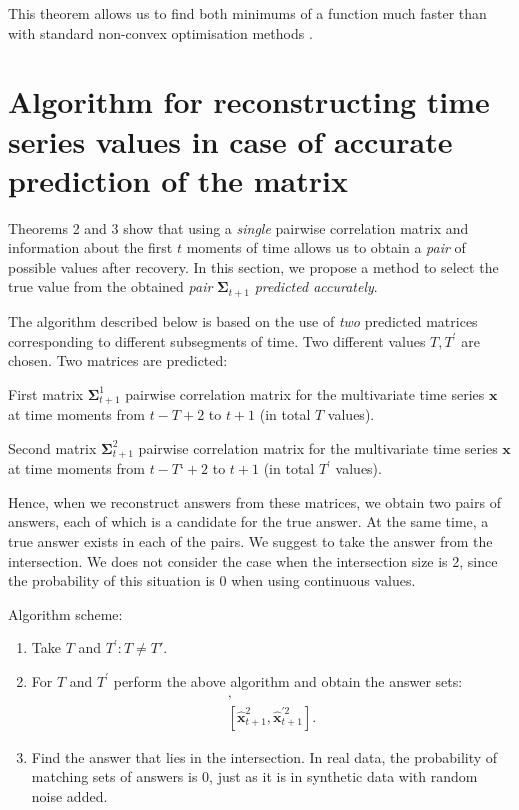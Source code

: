 \documentclass[12pt]{article}
\begin{document}
{This theorem allows us to find both minimums of a function much faster than with standard non-convex optimisation methods \cite{mikhalevich2024methodsnonconvexoptimization}.

\section{Algorithm for reconstructing time series values in case of accurate prediction of the matrix}

Theorems 2 and 3 show that using a \emph{single} pairwise correlation matrix and information about the first $t$ moments of time allows us to obtain a \emph{pair} of possible values after recovery. In this section, we propose a method to select the true value from the obtained \emph{pair} $\mathbf{\Sigma}_{t+1}$ \emph{predicted accurately}.

The algorithm described below is based on the use of \emph{two} predicted matrices corresponding to different subsegments of time. Two different values $T, T^\prime$ are chosen. Two matrices are predicted:

First matrix $\mathbf{\Sigma}_{t+1}^1$ pairwise correlation matrix for the multivariate time series $\mathbf{x}$ at time moments from $t-T+2$ to $t+1$ (in total $T$ values).

Second matrix $\mathbf{\Sigma}_{t+1}^2$ pairwise correlation matrix for the multivariate time series $\mathbf{x}$ at time moments from $t-T‘+2$ to $t+1$ (in total $T^\prime$ values).

Hence, when we reconstruct answers from these matrices, we obtain two pairs of answers, each of which is a candidate for the true answer. At the same time, a true answer exists in each of the pairs. We suggest to take the answer from the intersection. We does not consider the case when the intersection size is 2, since the probability of this situation is 0 when using continuous values.

Algorithm scheme:

\begin{enumerate}
	\item Take $T$ and $T^\prime: T \neq T'$.
	\item For $T$ and $T^\prime$ perform the above algorithm and obtain the answer sets: 
	\begin{gather*}
	 [\hat{\mathbf{x}}_{t+1}^1, \hat{\mathbf{x}}^{\prime 1}_{t+1}],\\ [\hat{\mathbf{x}}_{t+1}^2, \hat{\mathbf{x}}^{\prime 2}_{t+1}].
	 \end{gather*}
	\item Find the answer that lies in the intersection.
	In real data, the probability of matching sets of answers is 0, just as it is in synthetic data with random noise added.
\end{enumerate}

}
\end{document}

